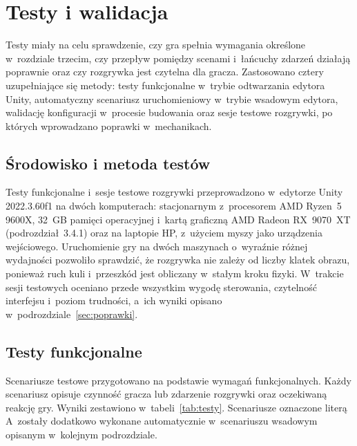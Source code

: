 \chapter{Testy i walidacja}
\label{rozdz:testy}

Testy miały na celu sprawdzenie, czy gra spełnia wymagania określone w~rozdziale trzecim,
czy przepływ pomiędzy scenami i~łańcuchy zdarzeń działają poprawnie oraz czy rozgrywka
jest czytelna dla gracza. Zastosowano cztery uzupełniające się metody: testy funkcjonalne
w~trybie odtwarzania edytora Unity, automatyczny scenariusz uruchomieniowy w~trybie
wsadowym edytora, walidację konfiguracji w~procesie budowania oraz sesje testowe rozgrywki,
po których wprowadzano poprawki w~mechanikach.

\section{Środowisko i metoda testów}

Testy funkcjonalne i~sesje testowe rozgrywki przeprowadzono w~edytorze Unity 2022.3.60f1
na dwóch komputerach: stacjonarnym z~procesorem AMD Ryzen~5 9600X, 32~GB pamięci
operacyjnej i~kartą graficzną AMD Radeon RX~9070~XT (podrozdział~3.4.1) oraz na laptopie
HP, z~użyciem myszy jako urządzenia wejściowego. Uruchomienie gry na dwóch maszynach
o~wyraźnie różnej wydajności pozwoliło sprawdzić, że rozgrywka nie zależy od liczby klatek
obrazu, ponieważ ruch kuli i~przeszkód jest obliczany w~stałym kroku fizyki.
W~trakcie sesji testowych oceniano przede wszystkim wygodę sterowania, czytelność interfejsu
i~poziom trudności, a~ich wyniki opisano w~podrozdziale~\ref{sec:poprawki}.

\section{Testy funkcjonalne}

Scenariusze testowe przygotowano na podstawie wymagań funkcjonalnych. Każdy scenariusz
opisuje czynność gracza lub zdarzenie rozgrywki oraz oczekiwaną reakcję gry. Wyniki
zestawiono w~tabeli~\ref{tab:testy}. Scenariusze oznaczone literą A~zostały dodatkowo
wykonane automatycznie w~scenariuszu wsadowym opisanym w~kolejnym podrozdziale.

